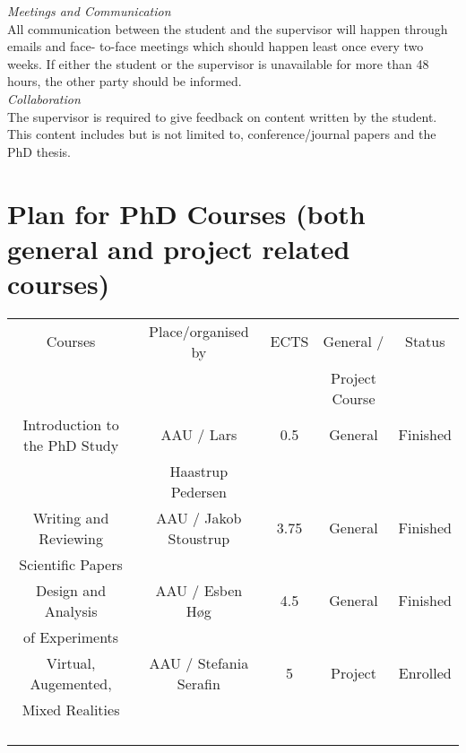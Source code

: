 \noindent\textit{Meetings and Communication}
\vspace{0.15cm}
\\
\noindent All communication between the student and the supervisor will happen through emails and face- to-face meetings which should happen least once every two weeks. If either the student or the supervisor is unavailable for more than 48 hours, the other party should be informed.
\\

\noindent\textit{Collaboration}
\vspace{0.15cm}
\\
\noindent The supervisor is required to give feedback on content written by the student. This content includes but is not limited to, conference/journal papers and the PhD thesis.

\section{Plan for PhD Courses (both general and project related courses)}

\begin{tabular}{|c|c|c|c|c|}
\hline
   Courses  & Place/organised by & ECTS & General / & Status \\
   & & & Project Course & \\
   \hline
   
\rowcolor{lightestblue} Introduction to the PhD Study & AAU / Lars & 0.5 & General &  Finished \\
\rowcolor{lightestblue} & Haastrup Pedersen & & & \\
   Writing and Reviewing & AAU / Jakob Stoustrup & 3.75 & General & Finished \\
   Scientific Papers & & & & \\
\rowcolor{lightestblue} Design and Analysis& AAU / Esben H\o g & 4.5 & General & Finished\\
\rowcolor{lightestblue} of Experiments & & & & \\
   Virtual, Augemented, & AAU / Stefania Serafin & 5 & Project & Enrolled\\
    Mixed Realities & & & &\\
  \rowcolor{lightestblue} & & & & \\
\rowcolor{lightestblue} & & & & \\
   & & & & \\
 & & & &\\
    \hline
\end{tabular}

